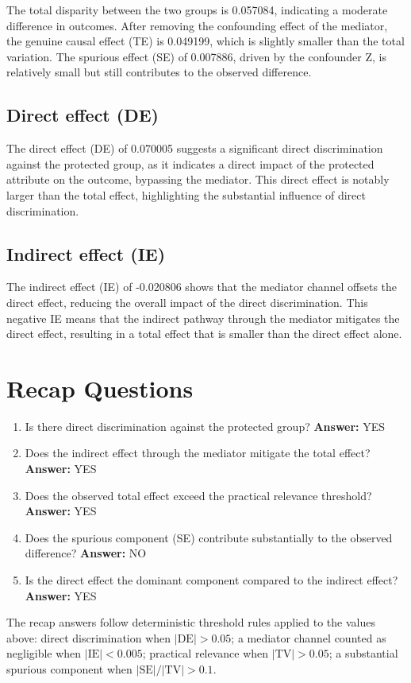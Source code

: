 \documentclass[11pt]{article}
\begin{document}
The total disparity between the two groups is 0.057084, indicating a moderate difference in outcomes. After removing the confounding effect of the mediator, the genuine causal effect (TE) is 0.049199, which is slightly smaller than the total variation. The spurious effect (SE) of 0.007886, driven by the confounder Z, is relatively small but still contributes to the observed difference.

\subsection{Direct effect (DE)}

The direct effect (DE) of 0.070005 suggests a significant direct discrimination against the protected group, as it indicates a direct impact of the protected attribute on the outcome, bypassing the mediator. This direct effect is notably larger than the total effect, highlighting the substantial influence of direct discrimination.

\subsection{Indirect effect (IE)}

The indirect effect (IE) of -0.020806 shows that the mediator channel offsets the direct effect, reducing the overall impact of the direct discrimination. This negative IE means that the indirect pathway through the mediator mitigates the direct effect, resulting in a total effect that is smaller than the direct effect alone.

\section{Recap Questions}

\begin{enumerate}
\item Is there direct discrimination against the protected group? \textbf{Answer:} YES
\item Does the indirect effect through the mediator mitigate the total effect? \textbf{Answer:} YES
\item Does the observed total effect exceed the practical relevance threshold? \textbf{Answer:} YES
\item Does the spurious component (SE) contribute substantially to the observed difference? \textbf{Answer:} NO
\item Is the direct effect the dominant component compared to the indirect effect? \textbf{Answer:} YES
\end{enumerate}

\vspace{1em}
\noindent\footnotesize
The recap answers follow deterministic threshold rules applied to the values above: direct discrimination when $|\mathrm{DE}| > 0.05$; a mediator channel counted as negligible when $|\mathrm{IE}| < 0.005$; practical relevance when $|\mathrm{TV}| > 0.05$; a substantial spurious component when $|\mathrm{SE}| / |\mathrm{TV}| > 0.1$.
\end{document}

